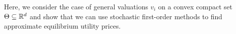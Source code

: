 %
Here, we consider the case of general valuations $v_i$ on a convex compact set $\Theta\subseteq \mathbb{R}^d$ and show that we can use stochastic first-order methods to find approximate equilibrium utility prices. 

